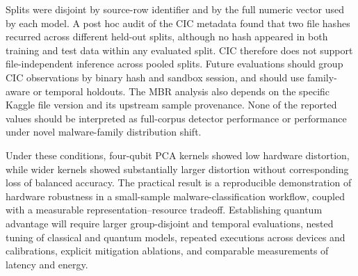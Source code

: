 Splits were disjoint by source-row identifier and by the full numeric vector used by each model. A post hoc audit of the CIC metadata found that two file hashes recurred across different held-out splits, although no hash appeared in both training and test data within any evaluated split. CIC therefore does not support file-independent inference across pooled splits. Future evaluations should group CIC observations by binary hash and sandbox session, and should use family-aware or temporal holdouts. The MBR analysis also depends on the specific Kaggle file version and its upstream sample provenance. None of the reported values should be interpreted as full-corpus detector performance or performance under novel malware-family distribution shift.

Under these conditions, four-qubit PCA kernels showed low hardware distortion, while wider kernels showed substantially larger distortion without corresponding loss of balanced accuracy. The practical result is a reproducible demonstration of hardware robustness in a small-sample malware-classification workflow, coupled with a measurable representation--resource tradeoff. Establishing quantum advantage will require larger group-disjoint and temporal evaluations, nested tuning of classical and quantum models, repeated executions across devices and calibrations, explicit mitigation ablations, and comparable measurements of latency and energy.

